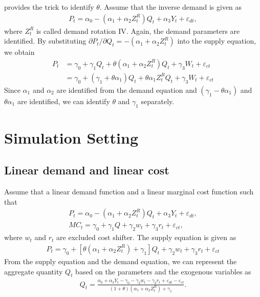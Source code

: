 \documentclass[11pt, a4paper]{article}
\begin{document}
\cite{bresnahan1982oligopoly} provides the trick to identify $\theta$. 
Assume that the inverse demand is given as 
\begin{align}
    P_{t}=\alpha_0 - (\alpha_1+\alpha_2 Z^R_t) Q_{t} + \alpha_3 Y_t + \varepsilon_{dt},
\end{align}
where $Z^R_t$ is called demand rotation IV.
Again, the demand parameters are identified.
By substituting $\partial P_t/\partial Q_t = -(\alpha_1+\alpha_2 Z^R_t)$ into the supply equation, we obtain
\begin{align}
    P_{t}&=\gamma_0+\gamma_1 Q_t + \theta (\alpha_1+\alpha_2 Z^R_t) Q_t + \gamma_3 W_t + \varepsilon_{ct} \\
    &= \gamma_0 + (\gamma_1 + \theta \alpha_1) Q_t + \theta\alpha_1 Z^R_tQ_t + \gamma_3 W_t + \varepsilon_{ct}  
\end{align}
Since $\alpha_1$ and $\alpha_2$ are identified from the demand equation and $(\gamma_1 - \theta\alpha_1)$ and $\theta \alpha_1$ are identified, we can identify $\theta$ and $\gamma_1$ separately.



\section{Simulation Setting}

\subsection{Linear demand and linear cost}
Assume that a linear demand function and a linear marginal cost function such that
\begin{align}
    P_t = \alpha_0 - (\alpha_1 + \alpha_2Z^R_t)Q_t + \alpha_3 Y_t + \varepsilon_{dt},\\
    MC_t = \gamma_0  + \gamma_1 Q + \gamma_2 w_t + \gamma_3 r_t + \varepsilon_{ct},
\end{align}
where $w_t$ and $r_t$ are excluded cost shifter.
The supply equation is given as
\begin{align}
    P_t = \gamma_0 + [\theta(\alpha_1 + \alpha_2Z^R_t)+ \gamma_1] Q_t   + \gamma_2 w_t + \gamma_3 r_t + \varepsilon_{ct}
\end{align}
From the supply equation and the demand equation, we can represent the aggregate quantity $Q_t$ based on the parameters and the exogenous variables as   
\begin{align}
    Q_t =  \frac{\alpha_0 + \alpha_3 Y_t - \gamma_0 - \gamma_2 w_t - \gamma_3 r_t + \varepsilon_{dt} - \varepsilon_{ct}}{(1 + \theta) (\alpha_1 + \alpha_2Z^R_t) + \gamma_1}.
\end{align}
\end{document}
